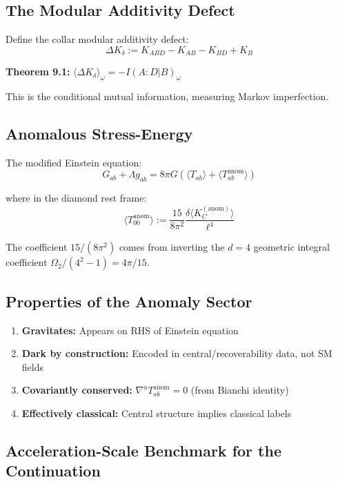 \subsection{The Modular Additivity Defect}\label{91-the-modular-additivity-defect}

Define the collar modular additivity defect: \[\Delta K_\delta := K_{ABD} - K_{AB} - K_{BD} + K_B\]

\textbf{Theorem 9.1:} \(\langle \Delta K_\delta \rangle_\omega = -I(A:D|B)_\omega\)

This is the conditional mutual information, measuring Markov imperfection.

\subsection{Anomalous Stress-Energy}\label{92-anomalous-stress-energy}

The modified Einstein equation: \[G_{ab} + \Lambda g_{ab} = 8\pi G \left(\langle T_{ab} \rangle + \langle T_{ab}^{\text{anom}} \rangle\right)\]

where in the diamond rest frame: \[\langle T_{00}^{\text{anom}} \rangle := \frac{15}{8\pi^2} \frac{\delta\langle K_C^{(\text{anom})} \rangle}{\ell^4}\]

The coefficient \(15/(8\pi^2)\) comes from inverting the \(d=4\) geometric integral coefficient \(\Omega_2/(4^2-1) = 4\pi/15\).

\subsection{Properties of the Anomaly Sector}\label{93-properties-of-the-anomaly-sector}

\begin{enumerate}
\def\labelenumi{\arabic{enumi}.}
\tightlist
\item
 \textbf{Gravitates:} Appears on RHS of Einstein equation
\item
 \textbf{Dark by construction:} Encoded in central/recoverability data, not SM fields
\item
 \textbf{Covariantly conserved:} \(\nabla^a T_{ab}^{\text{anom}} = 0\) (from Bianchi identity)
\item
 \textbf{Effectively classical:} Central structure implies classical labels
\end{enumerate}

\subsection{Acceleration-Scale Benchmark for the Continuation}\label{94-the-mond-acceleration-scale}

